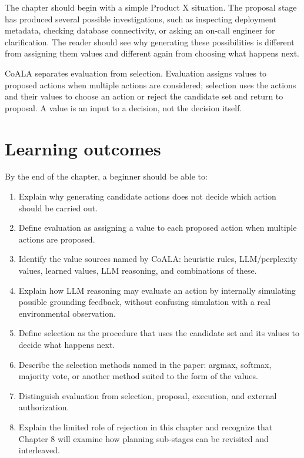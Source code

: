 The chapter should begin with a simple Product X situation. The proposal stage has produced several possible investigations, such as inspecting deployment metadata, checking database connectivity, or asking an on-call engineer for clarification. The reader should see why generating these possibilities is different from assigning them values and different again from choosing what happens next.

\begin{takeawaybox}
CoALA separates evaluation from selection. Evaluation assigns values to proposed actions when multiple actions are considered; selection uses the actions and their values to choose an action or reject the candidate set and return to proposal. A value is an input to a decision, not the decision itself.
\end{takeawaybox}

\section{Learning outcomes}
By the end of the chapter, a beginner should be able to:
\begin{enumerate}
  \item Explain why generating candidate actions does not decide which action should be carried out.
  \item Define evaluation as assigning a value to each proposed action when multiple actions are proposed.
  \item Identify the value sources named by CoALA: heuristic rules, LLM/perplexity values, learned values, LLM reasoning, and combinations of these.
  \item Explain how LLM reasoning may evaluate an action by internally simulating possible grounding feedback, without confusing simulation with a real environmental observation.
  \item Define selection as the procedure that uses the candidate set and its values to decide what happens next.
  \item Describe the selection methods named in the paper: argmax, softmax, majority vote, or another method suited to the form of the values.
  \item Distinguish evaluation from selection, proposal, execution, and external authorization.
  \item Explain the limited role of rejection in this chapter and recognize that Chapter 8 will examine how planning sub-stages can be revisited and interleaved.
\end{enumerate}

